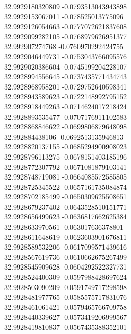 {32.9929180320809	-0.0793513043943898\\
32.9929153067011	-0.078525013775096\\
32.9929126054663	-0.0777072621837608\\
32.9929099282105	-0.0768979626951377\\
32.992907274768	-0.0760970292424755\\
32.9929046449731	-0.0753043766095576\\
32.9929020386604	-0.0745199204228107\\
32.9928994556645	-0.0737435771434743\\
32.9928968958201	-0.0729752640598341\\
32.9928943589623	-0.0722148992795152\\
32.9928918449263	-0.0714624017218424\\
32.9928893535477	-0.0707176911102583\\
32.9928868846622	-0.0699806879648098\\
32.992884438106	-0.0692513135946813\\
32.9928820137155	-0.0685294900908023\\
32.9928796113275	-0.0678151403185196\\
32.9928772307792	-0.0671081879103141\\
32.9928748719081	-0.0664085572585805\\
32.9928725345522	-0.0657161735084874\\
32.9928702185499	-0.0650309625508651\\
32.9928679237402	-0.0643528510151771\\
32.9928656499623	-0.0636817662625384\\
32.9928633970561	-0.063017636378801\\
32.9928611648619	-0.0623603901676811\\
32.9928589532206	-0.0617099571439616\\
32.9928567619736	-0.0610662675267499\\
32.9928545909628	-0.0604292522327731\\
32.9928524400309	-0.0597988428697624\\
32.9928503090209	-0.0591749717298598\\
32.9928481977765	-0.0585575717831076\\
32.9928461061421	-0.0579465766709758\\
32.9928440339627	-0.0573419206999567\\
32.9928419810837	-0.0567435388352101\\
}
